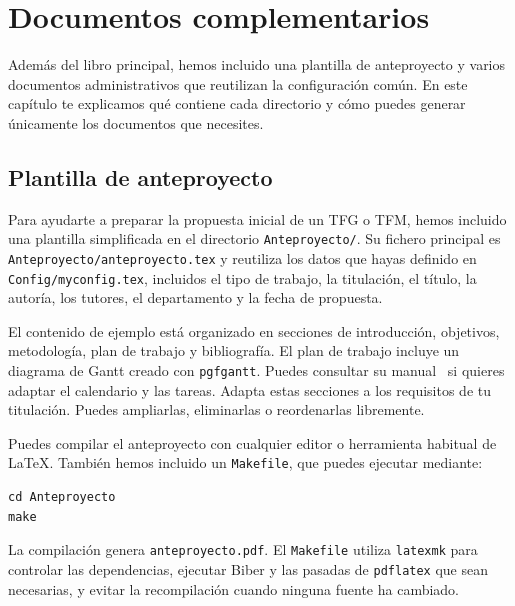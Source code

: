 %

\chapter{Documentos complementarios}
\label{cha:documentos-complementarios}

Además del libro principal, hemos incluido una plantilla de anteproyecto y varios documentos administrativos que reutilizan la configuración común. En este capítulo te explicamos qué contiene cada directorio y cómo puedes generar únicamente los documentos que necesites.

\section{Plantilla de anteproyecto}
\label{sec:plantilla-de-anteproyecto}

Para ayudarte a preparar la propuesta inicial de un TFG o TFM, hemos incluido una plantilla simplificada en el directorio \texttt{Anteproyecto/}. Su fichero principal es \texttt{Anteproyecto/anteproyecto.tex} y reutiliza los datos que hayas definido en \texttt{Config/myconfig.tex}, incluidos el tipo de trabajo, la titulación, el título, la autoría, los tutores, el departamento y la fecha de propuesta.

El contenido de ejemplo está organizado en secciones de introducción, objetivos, metodología, plan de trabajo y bibliografía. El plan de trabajo incluye un diagrama de Gantt creado con \texttt{pgfgantt}. Puedes consultar su manual~\cite{pgfgantt-manual} si quieres adaptar el calendario y las tareas. Adapta estas secciones a los requisitos de tu titulación. Puedes ampliarlas, eliminarlas o reordenarlas libremente.

Puedes compilar el anteproyecto con cualquier editor o herramienta habitual de \LaTeX{}. También hemos incluido un \texttt{Makefile}, que puedes ejecutar mediante:

\begin{verbatim}
cd Anteproyecto
make
\end{verbatim}

La compilación genera \texttt{anteproyecto.pdf}. El \texttt{Makefile} utiliza \texttt{latexmk} para controlar las dependencias, ejecutar Biber y las pasadas de \texttt{pdflatex} que sean necesarias, y evitar la recompilación cuando ninguna fuente ha cambiado.

